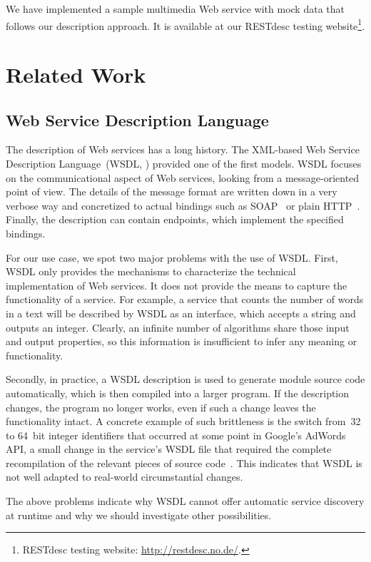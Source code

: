 \documentclass[runningheads,a4paper, twocolumn]{llncs}
\begin{document}
We have implemented a sample multimedia Web service with mock data that follows our description approach. It is available at our RESTdesc testing website\footnote{\label{RESTdescWebsite}RESTdesc testing website: \url{http://restdesc.no.de/}.}.

\section{Related Work} \label{sec:related-work}
\subsection{Web Service Description Language}
The description of Web services has a long history. The XML-based Web Service Description Language~(WSDL, \cite{WSDL1, WSDL2}) provided one of the first models. WSDL focuses on the communicational aspect of Web services, looking from a message-oriented point of view. The details of the message format are written down in a very verbose way and concretized to actual bindings such as SOAP~\cite{SOAP} or plain HTTP~\cite{HTTP}. Finally, the description can contain endpoints, which implement the specified bindings.

For our use case, we spot two major problems with the use of WSDL. First, WSDL only provides the mechanisms to characterize the technical implementation of Web services. It does not provide the means to capture the functionality of a service. For example, a service that counts the number of words in a text will be described by WSDL as an interface, which accepts a string and outputs an integer. Clearly, an infinite number of algorithms share those input and output properties, so this information is insufficient to infer any meaning or functionality.

Secondly, in practice, a WSDL description is used to generate module source code automatically, which is then compiled into a larger program. If the description changes, the program no longer works, even if such a change leaves the functionality intact. A concrete example of such brittleness is the switch from~32 to 64~bit integer identifiers that occurred at some point in Google's AdWords API, a small change in the service's WSDL file that required the complete recompilation of the relevant pieces of source code~\cite{WhySOAPSucks}. This indicates that WSDL is not well adapted to real-world circumstantial changes.

The above problems indicate why WSDL cannot offer automatic service discovery at runtime and why we should investigate other possibilities.
\end{document}

